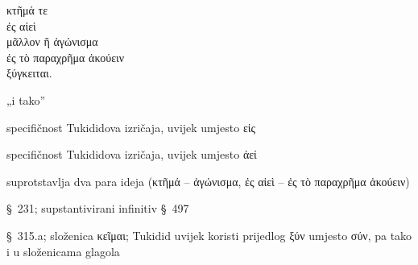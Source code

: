 {\large
\begin{greek}
\noindent κτῆμά τε \\
\tabto{2em} ἐς αἰεὶ \\
μᾶλλον ἢ ἀγώνισμα \\
\tabto{2em} ἐς τὸ παραχρῆμα ἀκούειν \\
ξύγκειται.\\

\end{greek}
}

\begin{description}[noitemsep]
\item[τε] „i tako”
\item[ἐς] specifičnost Tukididova izričaja, uvijek umjesto εἰς
\item[αἰεὶ] specifičnost Tukididova izričaja, uvijek umjesto ἀεί
\item[μᾶλλον ἢ] suprotstavlja dva para ideja \textgreek[variant=ancient]{(κτῆμά – ἀγώνισμα, ἐς αἰεὶ – ἐς τὸ παραχρῆμα ἀκούειν)}
\item[ἀκούειν] §~231; supstantivirani infinitiv §~497
\item[ξύγκειται] §~315.a; složenica κεῖμαι; Tukidid uvijek koristi prijedlog ξύν umjesto σύν, pa tako i u složenicama glagola

\end{description}



